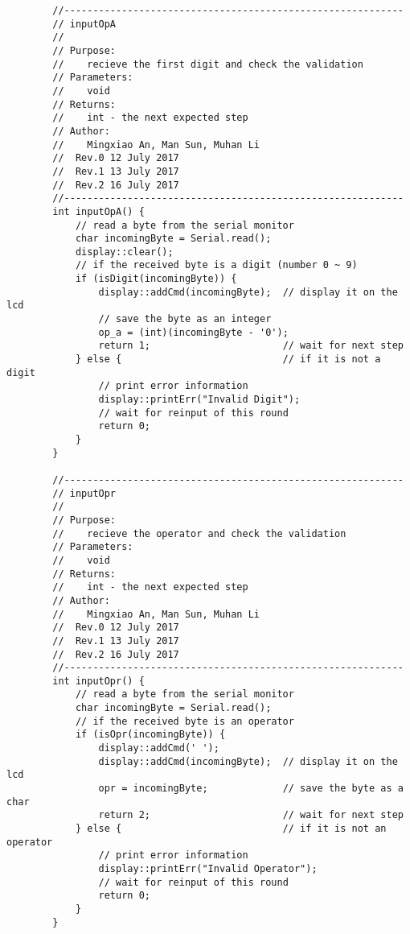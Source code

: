 \begin{verbatim}
        //-----------------------------------------------------------  
        // inputOpA 
        //  
        // Purpose:  
        //    recieve the first digit and check the validation
        // Parameters:  
        //    void 
        // Returns:  
        //    int - the next expected step   
        // Author:  
        //    Mingxiao An, Man Sun, Muhan Li
        //  Rev.0 12 July 2017
        //  Rev.1 13 July 2017
        //  Rev.2 16 July 2017
        //----------------------------------------------------------- 
        int inputOpA() {
            // read a byte from the serial monitor
            char incomingByte = Serial.read();
            display::clear();
            // if the received byte is a digit (number 0 ~ 9)
            if (isDigit(incomingByte)) {                
                display::addCmd(incomingByte);  // display it on the lcd
                // save the byte as an integer
                op_a = (int)(incomingByte - '0');       
                return 1;                       // wait for next step
            } else {                            // if it is not a digit
                // print error information
                display::printErr("Invalid Digit");     
                // wait for reinput of this round
                return 0;                       
            }
        }

        //-----------------------------------------------------------  
        // inputOpr 
        //  
        // Purpose:  
        //    recieve the operator and check the validation
        // Parameters:  
        //    void 
        // Returns:  
        //    int - the next expected step   
        // Author:  
        //    Mingxiao An, Man Sun, Muhan Li
        //  Rev.0 12 July 2017
        //  Rev.1 13 July 2017
        //  Rev.2 16 July 2017
        //----------------------------------------------------------- 
        int inputOpr() {
            // read a byte from the serial monitor
            char incomingByte = Serial.read();          
            // if the received byte is an operator
            if (isOpr(incomingByte)) {                  
                display::addCmd(' ');
                display::addCmd(incomingByte);  // display it on the lcd
                opr = incomingByte;             // save the byte as a char
                return 2;                       // wait for next step
            } else {                            // if it is not an operator
                // print error information
                display::printErr("Invalid Operator");  
                // wait for reinput of this round
                return 0;                           
            }
        }


\end{verbatim}

